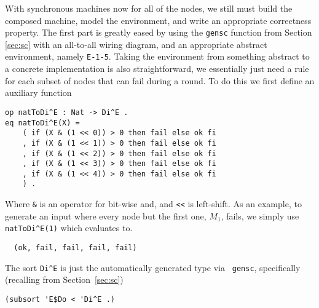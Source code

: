 \documentclass[copyright,creativecommons]{eptcs}
\begin{document}
With synchronous machines now for all of the nodes, we still must build the
composed machine, model the environment, and write an appropriate correctness
property. The first part is greatly eased by using the {\tt gensc} function
from Section \ref{sec:sc} with an all-to-all wiring diagram, and an appropriate
abstract environment, namely {\tt E-1-5}. Taking the environment from something
abstract to a concrete implementation is also straightforward, we essentially
just need a rule for each subset of nodes that can fail during a round. To do
this we first define an auxiliary function

\begin{center}
\begin{small}
\begin{boxedminipage}{0.60\textwidth}
\begin{verbatim}
op natToDi^E : Nat -> Di^E .
eq natToDi^E(X) = 
    ( if (X & (1 << 0)) > 0 then fail else ok fi
    , if (X & (1 << 1)) > 0 then fail else ok fi
    , if (X & (1 << 2)) > 0 then fail else ok fi
    , if (X & (1 << 3)) > 0 then fail else ok fi
    , if (X & (1 << 4)) > 0 then fail else ok fi
    ) .
\end{verbatim}
\end{boxedminipage}
\end{small}
\end{center}

\noindent
Where {\tt \&} is an operator for bit-wise and, and {\tt <<} is left-shift. As an example, to
generate an input where every node but the first one, $M_1$, fails, we simply
use {\tt natToDi\^{}E(1)} which evaluates to.

\begin{center}
\begin{small}
\begin{boxedminipage}{0.40\textwidth}
\begin{verbatim}
  (ok, fail, fail, fail, fail)
\end{verbatim}
\end{boxedminipage}
\end{small}
\end{center}

\noindent
The sort {\tt Di\^{}E} is just the automatically generated type via {\tt
gensc}, specifically (recalling from Section~\ref{sec:sc})

\begin{center}
\begin{small}
\begin{boxedminipage}{0.35\textwidth}
\begin{verbatim}
(subsort 'E$Do < 'Di^E .)
\end{verbatim}
\end{boxedminipage}
\end{small}
\end{center}
\end{document}
